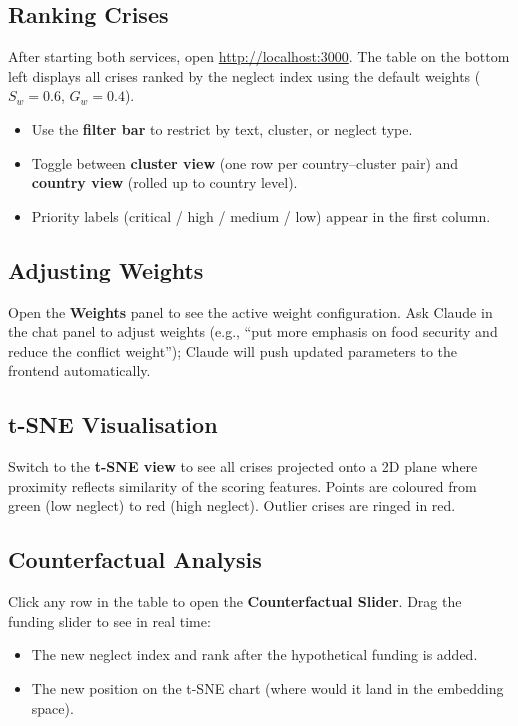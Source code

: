 \documentclass[11pt,a4paper]{article}
\begin{document}
\subsection{Ranking Crises}

After starting both services, open \url{http://localhost:3000}.
The table on the bottom left displays all crises ranked by the neglect index using the
default weights ($S_w = 0.6$, $G_w = 0.4$).

\begin{itemize}[nosep]
  \item Use the \textbf{filter bar} to restrict by text, cluster, or neglect type.
  \item Toggle between \textbf{cluster view} (one row per country--cluster pair)
        and \textbf{country view} (rolled up to country level).
  \item Priority labels (\textcolor{critical-red}{critical} /
        \textcolor{high-orange}{high} / medium / low) appear in the first column.
\end{itemize}

\subsection{Adjusting Weights}

Open the \textbf{Weights} panel to see the active weight configuration.
Ask Claude in the chat panel to adjust weights (e.g., ``put more emphasis on
food security and reduce the conflict weight''); Claude will push updated
parameters to the frontend automatically.

\subsection{t-SNE Visualisation}

Switch to the \textbf{t-SNE view} to see all crises projected onto a 2D plane
where proximity reflects similarity of the scoring features.
Points are coloured from green (low neglect) to red (high neglect).
Outlier crises are ringed in red.

\subsection{Counterfactual Analysis}

Click any row in the table to open the \textbf{Counterfactual Slider}.
Drag the funding slider to see in real time:

\begin{itemize}[nosep]
  \item The new neglect index and rank after the hypothetical funding is added.
  \item The new position on the t-SNE chart (where would it land in the embedding space).
\end{itemize}
\end{document}
